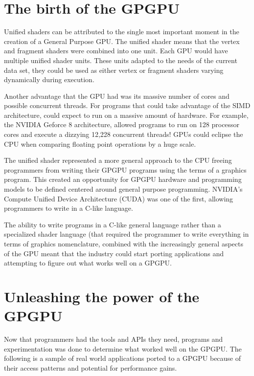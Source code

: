 \section*{The birth of the GPGPU}

Unified shaders can be attributed to the single most important moment in the creation of a General Purpose GPU. The unified shader means that the vertex and fragment shaders were combined into one unit. Each GPU would have multiple unified shader units. These units adapted to the needs of the current data set, they could be used as either vertex or fragment shaders varying dynamically during execution. 

Another advantage that the GPU had was its massive number of cores and possible concurrent threads. For programs that could take advantage of the SIMD architecture, could expect to run on a massive amount of hardware. For example, the NVIDIA Geforce 8 architecture, allowed programs to run on 128 processor cores and execute a dizzying 12,228 concurrent threads! GPUs could eclipse the CPU when comparing floating point operations by a huge scale. \cite{emergingtech}

The unified shader represented a more general approach to the CPU freeing programmers from writing their GPGPU programs using the terms of a graphics program. This created an opportunity for GPGPU hardware and programming models to be defined centered around general purpose programming. NVIDIA's Compute Unified Device Architecture (CUDA) was one of the first, allowing programmers to write in a C-like language. 

The ability to write programs in a C-like general language rather than a specialized shader language (that required the programmer to write everything in terms of graphics nomenclature, combined with the increasingly general aspects of the GPU meant that the industry could start porting applications and attempting to figure out what works well on a GPGPU. 

\section*{Unleashing the power of the GPGPU}


Now that programmers had the tools and APIs they need, programs and experimentation was done to determine what worked well on the GPGPU. The following is a sample of real world applications ported to a GPGPU because of their access patterns and potential for performance gains. 

